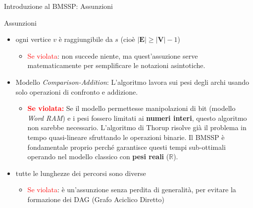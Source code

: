 \documentclass[aspectratio=169]{beamer}
\begin{document}
\begin{frame}{Introduzione al BMSSP: Assunzioni}
    \begin{block}{Assunzioni}
        \begin{itemize}
            \item ogni vertice $v$ è raggiungibile da $s$ (cioè $\vert \mathbf{E}\vert \geq \vert \mathbf{V}\vert-1$)
            \begin{itemize}
                \item \textcolor{red}{Se violata}: non succede niente, ma quest'assuzione serve matematicamente per semplificare le notazioni asintotiche.
            \end{itemize}
            \item Modello \textit{Comparison-Addition}: L'algoritmo lavora sui pesi degli archi usando solo operazioni di confronto e addizione.
\begin{itemize}
    \item \textcolor{red}{\textbf{Se violata:}} Se il modello permettesse manipolazioni di bit (modello \textit{Word RAM}) e i pesi fossero limitati ai \textbf{numeri interi}, questo algoritmo non sarebbe necessario. L'algoritmo di Thorup risolve già il problema in tempo quasi-lineare sfruttando le operazioni binarie. Il BMSSP è fondamentale proprio perché garantisce questi tempi sub-ottimali operando nel modello classico con \textbf{pesi reali} ($\mathbb{R}$).
\end{itemize}
            \item tutte le lunghezze dei percorsi sono diverse
\begin{itemize}
    \item \textcolor{red}{Se violata}: è un'assunzione senza perdita di generalità, per evitare la formazione dei DAG (Grafo Aciclico Diretto)
\end{itemize}

        \end{itemize}
    \end{block}
\end{frame}
\end{document}
